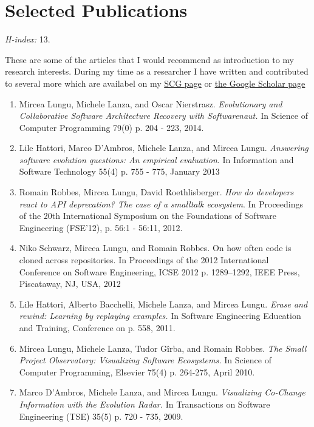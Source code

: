 \section{Selected Publications}
\emph{H-index:} 13.

These are some of the articles that I would recommend as introduction to my research interests. During my time as a researcher I have written and contributed to several more which are availabel on my \href{http://scg.unibe.ch/staff/mircea/pubs}{SCG page} or \href{http://scholar.google.ch/citations?user=7zx6Cg0AAAAJ}{the Google Scholar page}

\begin{enumerate}
\item Mircea Lungu, Michele Lanza, and Oscar Nierstrasz. \emph{Evolutionary and Collaborative Software Architecture Recovery with Softwarenaut.}  In Science of Computer Programming 79(0) p. 204 - 223, 2014.

\item Lile Hattori, Marco D'Ambros, Michele Lanza, and Mircea Lungu. \emph{Answering software evolution questions: An empirical evaluation}. In Information and Software Technology 55(4) p. 755 - 775, January 2013

\item Romain Robbes, Mircea Lungu, David Roethlisberger. \emph{How do developers react to API deprecation? The case of a smalltalk ecosystem}. In Proceedings of the 20th International Symposium on the	 Foundations of Software Engineering (FSE'12), p. 56:1 - 56:11, 2012.

\item Niko Schwarz, Mircea Lungu, and Romain Robbes. On how often code is cloned across repositories. In Proceedings of the 2012 International Conference on Software Engineering, ICSE 2012 p. 1289--1292, IEEE Press, Piscataway, NJ, USA, 2012

\item Lile Hattori, Alberto Bacchelli, Michele Lanza, and Mircea Lungu. \emph{Erase and rewind: Learning by replaying examples.} In Software Engineering Education and Training, Conference on p. 558, 2011.

\item Mircea Lungu, Michele Lanza, Tudor G\^irba, and Romain Robbes. \emph{The Small Project Observatory: Visualizing Software Ecosystems.} In Science of Computer Programming, Elsevier 75(4) p. 264-275, April 2010.

\item Marco D'Ambros, Michele Lanza, and Mircea Lungu. \emph{Visualizing Co-Change Information with the Evolution Radar.} In Transactions on Software Engineering (TSE) 35(5) p. 720 - 735, 2009.
\end{enumerate}




